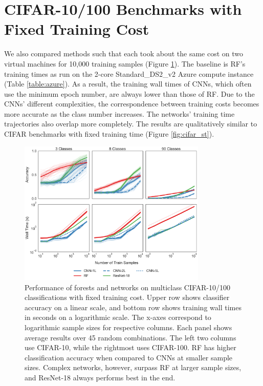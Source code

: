 \section{CIFAR-10/100 Benchmarks with Fixed Training Cost}
\label{app:cifar_sc}
We also compared methods such that each took about the same cost on two virtual machines for 10,000 training samples (Figure \ref{fig:cifar_sc}). The baseline is RF's training times as run on the 2-core Standard\_DS2\_v2 Azure compute instance (Table \ref{table:azure}). 
As a result, the training wall times of CNNs, which often use the minimum epoch number, are always lower than those of RF. Due to the CNNs' different complexities, the correspondence between training costs becomes more accurate as the class number increases. The networks' training time trajectories also overlap more completely. The results are qualitatively similar to CIFAR benchmarks with fixed training time (Figure \ref{fig:cifar_st}).

\begin{figure}[!htb]
\centering
\includegraphics[width=0.8\textwidth]{figures/cifar_sc.pdf}
  \caption{Performance of forests and networks on multiclass CIFAR-10/100 classifications with fixed training cost.
  Upper row shows classifier accuracy on a linear scale, and bottom row shows training wall times in seconds on a logarithmic scale. The x-axes correspond to logarithmic sample sizes for respective columns. Each panel shows average results over 45 random combinations. The left two columns use CIFAR-10, while the rightmost uses CIFAR-100.
  RF has higher classification accuracy when compared to CNNs at smaller sample sizes. Complex networks, however, surpass RF at larger sample sizes, and ResNet-18 always performs best in the end.
  }
\label{fig:cifar_sc}
\end{figure}
\clearpage

